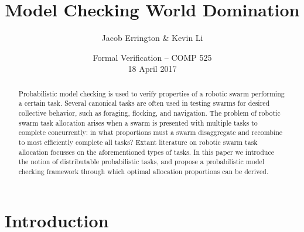 \documentclass[11pt]{article}
\title{Model Checking World Domination}
\author{Jacob Errington \& Kevin Li}
\date{Formal Verification -- COMP 525\\18 April 2017}
\theoremstyle{definition}
\begin{document}
\maketitle

\begin{abstract}
    Probabilistic model checking is used to verify properties of a robotic
    swarm performing a certain task.
    Several canonical tasks are often used in testing swarms for desired
    collective behavior, such as foraging, flocking, and navigation.
    The problem of robotic swarm task allocation arises when a swarm is
    presented with multiple tasks to complete concurrently: in what proportions
    must a swarm disaggregate and recombine to most efficiently complete all
    tasks?
    Extant literature on robotic swarm task allocation focusses on the
    aforementioned types of tasks.
    In this paper we introduce the notion of distributable probabilistic tasks,
    and propose a probabilistic model checking framework through which optimal
    allocation proportions can be derived.
\end{abstract}

\section{Introduction}
\label{sec:intro}
\end{document}
